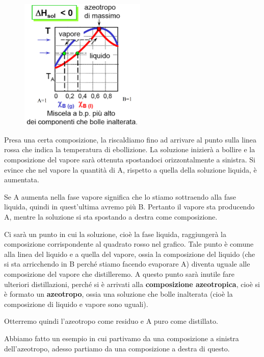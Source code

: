 \begin{minipage}{0.4\textwidth}
    \begin{figure}[H]
        \includegraphics[width=6cm]{immagini/distillazione_esotermica.png}
    \end{figure}
\end{minipage}
\begin{minipage}{0.6\textwidth}
    \vspace{0.6cm}Presa una certa composizione, la riscaldiamo fino ad arrivare al punto sulla linea rossa che indica la temperatura di ebollizione. La soluzione inizierà a bollire e la composizione del vapore sarà ottenuta spostandoci orizzontalmente a sinistra. Si evince che nel vapore la quantità di A, rispetto a quella della soluzione liquida, è aumentata.

    Se A aumenta nella fase vapore significa che lo stiamo sottraendo alla fase liquida, quindi in quest'ultima avremo più B. Pertanto il vapore sta producendo A, mentre la soluzione si sta spostando a destra come composizione.
\end{minipage}

\vspace{0.2cm}Ci sarà un punto in cui la soluzione, cioè la fase liquida, raggiungerà la composizione corrispondente al quadrato rosso nel grafico. Tale punto è comune alla linea del liquido e a quella del vapore, ossia la composizione del liquido (che si sta arricchendo in B perché stiamo facendo evaporare A) diventa uguale alle composizione del vapore che distilleremo. A questo punto sarà inutile fare ulteriori distillazioni, perché si è arrivati alla \textbf{composizione azeotropica}, cioè si è formato un \textbf{azeotropo}, ossia una soluzione che bolle inalterata (cioè la composizione di liquido e vapore sono uguali).

Otterremo quindi l'azeotropo come residuo e A puro come distillato.

Abbiamo fatto un esempio in cui partivamo da una composizione a sinistra dell'azeotropo, adesso partiamo da una composizione a destra di questo.

